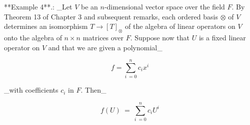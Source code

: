 **Example 4**.: _Let \(V\) be an \(n\)-dimensional vector space over the field \(F\). By Theorem 13 of Chapter 3 and subsequent remarks, each ordered basis \(\otimes\) of \(V\) determines an isomorphism \(T\to[T]_{\otimes}\) of the algebra of linear operators on \(V\) onto the algebra of \(n\times n\) matrices over \(F\). Suppose now that \(U\) is a fixed linear operator on \(V\) and that we are given a polynomial_

\[f=\sum_{i\ =0}^{n}c_{i}x^{i}\]

_with coefficients \(c_{i}\) in \(F\). Then_

\[f(U)\ =\ \sum_{i\ =0}^{n}c_{i}U^{i}\] 